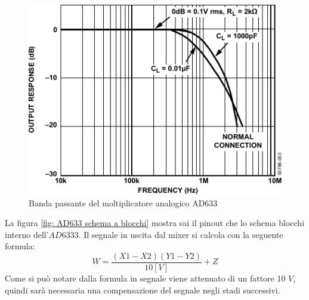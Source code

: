 \documentclass[titlepage]{report}
\begin{document}
	\begin{figure}[h]
		\centering
		\includegraphics[scale=1]{Immagini/ad633_bp.pdf}
		\caption{Banda passante del moltiplicatore analogico AD633}
		\label{fig:sch_ad633}
	\end{figure}

	\noindent La figura \ref{fig: AD633 schema a blocchi} mostra sai il pinout che lo schema  blocchi interno dell'$AD6333$. Il segnale in uscita dal mixer si calcola con la seguente formula:
	\begin{equation}
		\label{eq: funzione trasferimeto AD633}
		W = \frac{(X1 - X2)(Y1 - Y2)}{10 [V]}  + Z 
	\end{equation}
	Come si può notare dalla formula in segnale viene attenuato di un fattore 10 $V$, quindi sarà necessaria una compensazione del segnale negli stadi successivi. 
\end{document}
